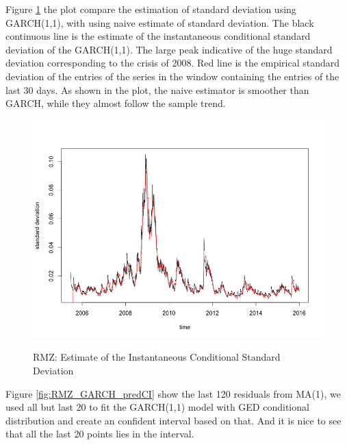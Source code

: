 \documentclass[12pt]{article}
\begin{document}
Figure \ref{fig:RMZ_GARCH_ESTsd} the plot compare the estimation of standard deviation using GARCH(1,1), with using naive estimate of standard deviation. The black continuous line is the estimate of the instantaneous conditional standard deviation of the GARCH(1,1). The large peak indicative of the huge standard deviation corresponding to the crisis of 2008. Red line is the empirical standard deviation of the entries of the series in the window containing the entries of the last 30 days.  As shown in the plot, the naive estimator is smoother than GARCH, while they almost follow the sample trend.
\begin{figure}
  \caption{RMZ: Estimate of the Instantaneous Conditional Standard Deviation}
  \includegraphics[width = \textwidth]{../results/RMZ_GARCH_ESTsd}
  \label{fig:RMZ_GARCH_ESTsd}
\end{figure}

Figure \ref{fig:RMZ_GARCH_predCI} show the last 120 residuals from MA(1), we used all but last 20 to fit the GARCH(1,1) model with GED conditional distribution and create an confident interval based on that. And it is nice to see that all the last 20 points lies in the interval.
\end{document}
